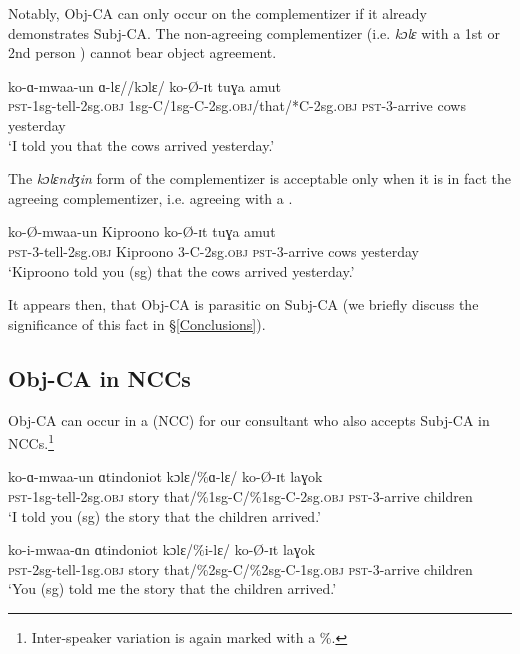 \documentclass[output=paper
,newtxmath
,modfonts
,nonflat]{langsci/langscibook}
\begin{document}
\noindent Notably,  Obj-CA can only occur on the complementizer if it already demonstrates Subj-CA. The non-agreeing complementizer (i.e. \textit{kɔlɛ} with a 1st or 2nd person ) cannot bear object agreement. 

\ea
\gll ko-ɑ-mwaa-un ɑ-lɛ//kɔlɛ/ ko-\O-ɪt tuɣa amut \\
\textsc{pst}-1sg-tell-2sg.\textsc{obj} 1sg-C/1sg-C-2sg.\textsc{obj}/that/*C-2sg.\textsc{obj} \textsc{pst}-3-arrive cows yesterday \\
\glt `I told you that the cows arrived yesterday.'
\z

\noindent The \textit{kɔlɛndʒin} form of the complementizer is acceptable only when it is in fact the agreeing complementizer, i.e. agreeing with a  .

\ea
\gll ko-\O-mwaa-un Kiproono  ko-\O-ɪt tuɣa amut \\
\textsc{pst}-3-tell-2sg.\textsc{obj} Kiproono 3-C-2sg.\textsc{obj} \textsc{pst}-3-arrive cows yesterday \\
\glt `Kiproono told you (sg) that the cows arrived yesterday.'
\z

\noindent It appears then, that Obj-CA is parasitic on Subj-CA (we briefly discuss the significance of this fact in \S \ref{Conclusions}). 

\subsection{Obj-CA in NCCs}

Obj-CA can occur in a  (NCC) for our consultant who also accepts Subj-CA in NCCs.\footnote{Inter-speaker variation is again marked with a \%.}

\ea
\begin{xlist}

\ex
\gll ko-ɑ-mwaa-un ɑtindoniot kɔlɛ/\%ɑ-lɛ/ ko-\O-ɪt laɣok \\
\textsc{pst}-1sg-tell-2sg.\textsc{obj} story that/\%1sg-C/\%1sg-C-2sg.\textsc{obj} \textsc{pst}-3-arrive children \\
\glt `I told you (sg) the story that the children arrived.'

\ex
\gll ko-i-mwaa-ɑn ɑtindoniot kɔlɛ/\%i-lɛ/ ko-\O-ɪt laɣok \\
\textsc{pst}-2sg-tell-1sg.\textsc{obj} story that/\%2sg-C/\%2sg-C-1sg.\textsc{obj} \textsc{pst}-3-arrive children \\
\glt `You (sg) told me the story that the children arrived.'

\end{xlist}
\z
\end{document}
